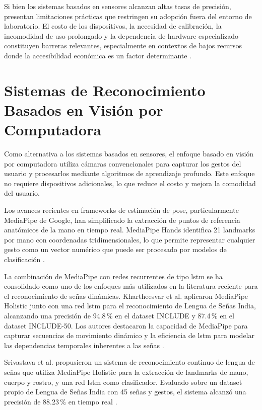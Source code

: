 Si bien los sistemas basados en sensores alcanzan altas tasas de precisión, presentan
limitaciones prácticas que restringen su adopción fuera del entorno de laboratorio. El costo
de los dispositivos, la necesidad de calibración, la incomodidad de uso prolongado y la
dependencia de hardware especializado constituyen barreras relevantes, especialmente en
contextos de bajos recursos donde la accesibilidad económica es un factor determinante \cite{sadik_survey_2025}.

\section{Sistemas de Reconocimiento Basados en Visión por Computadora}

Como alternativa a los sistemas basados en sensores, el enfoque basado en visión por
computadora utiliza cámaras convencionales para capturar los gestos del usuario y
procesarlos mediante algoritmos de aprendizaje profundo. Este enfoque no requiere
dispositivos adicionales, lo que reduce el costo y mejora la comodidad del usuario.

Los avances recientes en frameworks de estimación de pose, particularmente MediaPipe
de Google, han simplificado la extracción de puntos de referencia anatómicos de la mano
en tiempo real. MediaPipe Hands identifica 21 landmarks por mano con coordenadas
tridimensionales, lo que permite representar cualquier gesto como un vector numérico que
puede ser procesado por modelos de clasificación \cite{zhang_mediapipe_2020}.

La combinación de MediaPipe con redes recurrentes de tipo \acrshort{lstm} se ha consolidado como
uno de los enfoques más utilizados en la literatura reciente para el reconocimiento de señas
dinámicas. Khartheesvar et al. aplicaron MediaPipe Holistic junto con una red \acrshort{lstm} para
el reconocimiento de Lengua de Señas India, alcanzando una precisión de 94.8\,\% en el
dataset INCLUDE y 87.4\,\% en el dataset INCLUDE-50. Los autores destacaron la capacidad
de MediaPipe para capturar secuencias de movimiento dinámico y la eficiencia de \acrshort{lstm}
para modelar las dependencias temporales inherentes a las señas \cite{khartheesvar_indian_2024}.

Srivastava et al. propusieron un sistema de reconocimiento continuo de lengua de señas
que utiliza MediaPipe Holistic para la extracción de landmarks de mano, cuerpo y rostro, y
una red \acrshort{lstm} como clasificador. Evaluado sobre un dataset propio de Lengua de Señas
India con 45 señas y gestos, el sistema alcanzó una precisión de 88.23\,\% en tiempo real \cite{srivastava_continuous_2024}.

